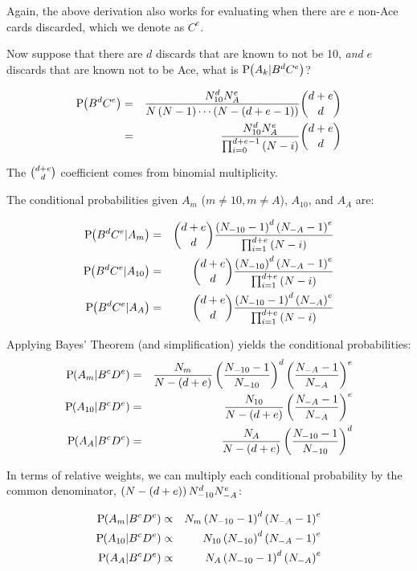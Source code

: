 Again, the above derivation also works for evaluating
when there are $e$ non-Ace cards discarded,
which we denote as $C^e$.

Now suppose that there are $d$ discards that are known to not be 10,
\emph{and} $e$ discards that are known not to be Ace, 
what is $\textrm{P}\hspace{-.5ex}\left(A_k|B^d C^e\right)$?

\begin{eqnarray}
\textrm{P}\hspace{-.5ex}\left(B^d C^e\right) &=& \frac{N_{10}^d N_A^e}{N \left(N-1\right) \cdots \left(N-\left(d+e-1\right)\right)} \binom{d+e}{d} \nonumber \\
&=& \frac{N_{10}^d N_A^e}{\prod_{i=0}^{d+e-1}{\left(N-i\right)}} \binom{d+e}{d}
\end{eqnarray}

\noindent
The $\binom{d+e}{d}$ coefficient comes from binomial multiplicity.

\noindent
The conditional probabilities given $A_m$ ($m\neq{}10,m\neq{}A$), 
$A_{10}$, and $A_A$ are:

\begin{eqnarray}
\textrm{P}\hspace{-.5ex}\left(B^d C^e|A_m\right) &=& \binom{d+e}{d} \frac{\left(N_{-10}-1\right)^d \left(N_{-A}-1\right)^e}{\prod_{i=1}^{d+e}{\left(N-i\right)}}\\
\textrm{P}\hspace{-.5ex}\left(B^d C^e|A_{10}\right) &=& \binom{d+e}{d} \frac{\left(N_{-10}\right)^d \left(N_{-A}-1\right)^e}{\prod_{i=1}^{d+e}{\left(N-i\right)}}\\
\textrm{P}\hspace{-.5ex}\left(B^d C^e|A_A\right) &=& \binom{d+e}{d} \frac{\left(N_{-10}-1\right)^d \left(N_{-A}\right)^e}{\prod_{i=1}^{d+e}{\left(N-i\right)}}
\end{eqnarray}

\noindent
Applying Bayes' Theorem (and simplification) 
yields the conditional probabilities:
\begin{eqnarray}
\textrm{P}\hspace{-.5ex}\left(A_m|B^c D^e\right) &=& \frac{N_m}{N-\left(d+e\right)}
\left(\frac{N_{-10}-1}{N_{-10}}\right)^d
\left(\frac{N_{-A}-1}{N_{-A}}\right)^e\\
\textrm{P}\hspace{-.5ex}\left(A_{10}|B^c D^e\right) &=& \frac{N_{10}}{N-\left(d+e\right)}
\left(\frac{N_{-A}-1}{N_{-A}}\right)^e\\
\textrm{P}\hspace{-.5ex}\left(A_A|B^c D^e\right) &=& \frac{N_A}{N-\left(d+e\right)}
\left(\frac{N_{-10}-1}{N_{-10}}\right)^d
\end{eqnarray}

In terms of relative weights, we can multiply each conditional probability
by the common denominator, $\left(N-\left(d+e\right)\right)N_{-10}^d N_{-A}^e$:

\begin{eqnarray}
\textrm{P}\hspace{-.5ex}\left(A_m|B^c D^e\right) &\propto& N_m \left(N_{-10}-1\right)^d \left(N_{-A}-1\right)^e\\
\textrm{P}\hspace{-.5ex}\left(A_{10}|B^c D^e\right) &\propto& N_{10} \left(N_{-10}\right)^d \left(N_{-A}-1\right)^e\\
\textrm{P}\hspace{-.5ex}\left(A_A|B^c D^e\right) &\propto& N_A \left(N_{-10}-1\right)^d \left(N_{-A}\right)^e
\end{eqnarray}

